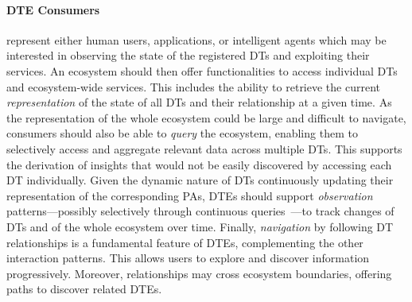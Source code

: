 \paragraph{\ac{DTE} Consumers} represent either human users, applications, or intelligent agents which may be interested in observing the state of the registered \acp{DT} and exploiting their services.
%
An ecosystem should then offer functionalities to access individual \acp{DT} and ecosystem-wide services.
This includes the ability to retrieve the current \emph{representation} of the state of all \acp{DT} and their relationship at a given time.
%
As the representation of the whole ecosystem could be large and difficult to navigate, consumers should also be able to \emph{query} the ecosystem, enabling them to selectively access and aggregate relevant data across multiple \acp{DT}.
%
This supports the derivation of insights that would not be easily discovered by accessing each \ac{DT} individually.
%
Given the dynamic nature of \acp{DT} continuously updating their representation of the corresponding \acp{PA}, \acp{DTE} should support \emph{observation} patterns---possibly selectively through continuous queries~\cite{babu2001sigmod}---to track changes of \acp{DT} and of the whole ecosystem over time.
Finally, \emph{navigation} by following \ac{DT} relationships is a fundamental feature of \acp{DTE}, complementing the other interaction patterns.
%
This allows users to explore and discover information progressively.
Moreover, relationships may cross ecosystem boundaries, offering paths to discover related \acp{DTE}.

